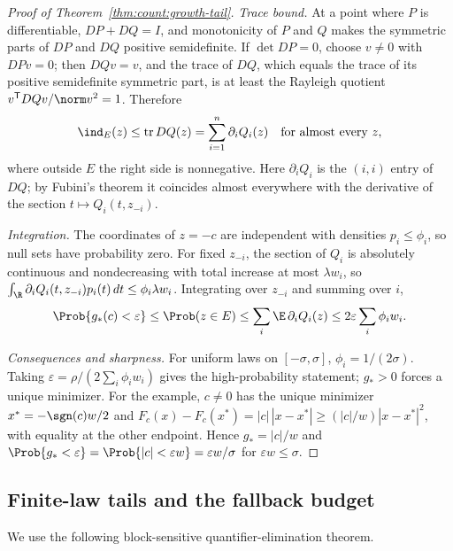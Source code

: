 \begin{proof}[Proof of Theorem~\ref{thm:count:growth-tail}]
\emph{Trace bound.} At a point where $P$ is differentiable,
$DP+DQ=I$, and monotonicity of $P$ and $Q$ makes the symmetric parts of $DP$
and $DQ$ positive semidefinite. If $\det DP=0$, choose $v\ne0$ with $DPv=0$;
then $DQv=v$, and the trace of $DQ$, which equals the trace of its positive
semidefinite symmetric part, is at least the Rayleigh quotient
$v^{\mathsf T} DQv/\norm v^2=1$. Therefore
\[
 \ind_E(z)\le\operatorname{tr}DQ(z)=\sum_{i=1}^n\partial_iQ_i(z)
 \quad\text{for almost every }z,
\]
where outside $E$ the right side is nonnegative. Here $\partial_iQ_i$ is the
$(i,i)$ entry of $DQ$; by Fubini's theorem it coincides almost everywhere with
the derivative of the section $t\mapsto Q_i(t,z_{-i})$.

\emph{Integration.} The coordinates of $z=-c$ are independent with densities
$p_i\le\phi_i$, so null sets have probability zero. For fixed $z_{-i}$, the
section of $Q_i$ is absolutely continuous and nondecreasing with total
increase at most $\lambda w_i$, so
$\int_\R\partial_iQ_i(t,z_{-i})p_i(t)\,dt\le\phi_i\lambda w_i$. Integrating
over $z_{-i}$ and summing over $i$,
\[
 \Prob\{g_*(c)<\varepsilon\}\le\Prob(z\in E)\le\sum_i\E\,\partial_iQ_i(z)
 \le2\varepsilon\sum_i\phi_iw_i .
\]

\emph{Consequences and sharpness.} For uniform laws on $[-\sigma,\sigma]$,
$\phi_i=1/(2\sigma)$. Taking $\varepsilon=\rho/(2\sum_i\phi_iw_i)$ gives the
high-probability statement; $g_*>0$ forces a unique minimizer. For the
example, $c\ne0$ has the unique minimizer $x^*=-\sgn(c)w/2$ and
$F_c(x)-F_c(x^*)=|c|\,|x-x^*|\ge(|c|/w)|x-x^*|^2$, with equality at the other
endpoint. Hence $g_*=|c|/w$ and
$\Prob\{g_*<\varepsilon\}=\Prob\{|c|<\varepsilon w\}=\varepsilon w/\sigma$
for $\varepsilon w\le\sigma$.
\end{proof}

\subsection{Finite-law tails and the fallback budget}

We use the following block-sensitive quantifier-elimination theorem.

